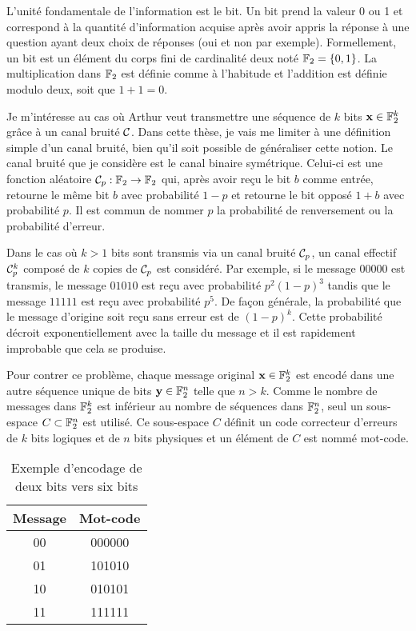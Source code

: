 L'unité fondamentale de l'information est le bit.
Un bit prend la valeur 0 ou 1 et correspond à la quantité 
d'information acquise après avoir appris la réponse 
à une question ayant deux choix de réponses (oui et non par exemple).
Formellement, un bit est un élément du corps fini de cardinalité deux noté $\mathbb{F}_{2} = \qty{0, 1}$.
La multiplication dans $\mathbb{F}_{2}$ est définie comme à l'habitude
et l'addition est définie modulo deux, soit que $1 + 1 = 0$.

Je m'intéresse au cas où Arthur veut transmettre une séquence 
de $k$ bits $\vb{x} \in \mathbb{F}_{2}^k$ grâce à un canal bruité $\mathcal{C}$.
Dans cette thèse,
je vais me limiter à une définition simple d'un canal bruité,
bien qu'il soit possible de généraliser cette notion. 
Le canal bruité que je considère est le canal binaire symétrique.
Celui-ci est une fonction aléatoire $\mathcal {\mathcal{C}}_p: \mathbb{F}_{2} \to \mathbb{F}_{2}$
qui, après avoir reçu le bit $b$ comme entrée, 
retourne le même bit $b$ avec probabilité $1 - p$ et retourne le
bit opposé $1 + b$ avec probabilité $p$.
Il est commun de nommer $p$ la probabilité de renversement 
ou la probabilité d'erreur.

Dans le cas où $k > 1$ bits sont transmis via un canal bruité $\mathcal{C}_p$,
un canal effectif $\mathcal{C}_p^k$ composé de $k$ copies de $\mathcal{C}_p$
est considéré.
Par exemple,
si le message $00000$ est transmis,
le message $01010$ est reçu avec probabilité $p^2(1 - p)^3$ 
tandis que le message $11111$ est reçu avec probabilité $p^5$.
De façon générale, 
la probabilité que le message d'origine soit reçu sans erreur est de $(1 - p)^k$.
Cette probabilité décroit exponentiellement avec la taille du message 
et il est rapidement improbable que cela se produise.

Pour contrer ce problème,
chaque message original $\vb x \in \mathbb{F}_{2}^k$ est encodé dans une autre séquence 
unique de bits $\vb{y} \in \mathbb{F}_{2}^n$ telle que $n > k$.
Comme le nombre de messages dans $\mathbb{F}_{2}^k$ est inférieur au nombre
de séquences dans $\mathbb{F}_{2}^n$,
seul un sous-espace $C \subset \mathbb{F}_{2}^n$ est utilisé.
Ce sous-espace $C$ définit un code correcteur d'erreurs
de $k$ bits logiques et de $n$ bits physiques 
et un élément de $C$ est nommé mot-code.

\begin{table}[t]
  \caption{Exemple d'encodage de deux bits vers six bits}
  \label{tab:exemple_encodage}
  \begin{center}
    \begin{tabular}[c]{cc}
      \textbf{Message} & \textbf{Mot-code} \\
      \hline
      00 & 000000 \\
      01 & 101010 \\
      10 & 010101 \\
      11 & 111111
    \end{tabular}
  \end{center}
\end{table}

